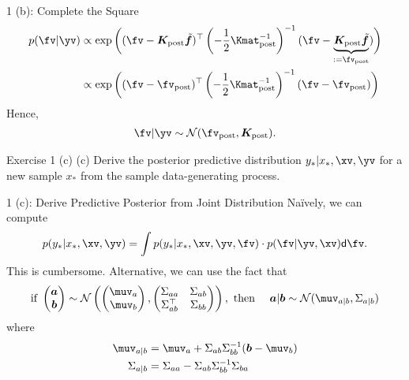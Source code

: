 \documentclass[aspectratio=169]{beamer}
\renewcommand{\N}{\mathcal{N}}
\newcommand{\kpinv}{\Kmat_{\text{post}}^{-1}}
\newcommand{\tfv}{\tilde{\bm{f}}}
\newcommand{\bv}{\bm{b}}
\newcommand{\Kpost}{\bm{K}_{\text{post}}}
\newcommand{\fpost}{\fv_{\text{post}}}
\newcommand{\ys}{y_{*}}
\newcommand{\xs}{x_{*}}
\newcommand{\av}{\bm{a}}
\begin{document}
\begin{frame}{1 (b): Complete the Square}
	\begin{align*}
		p(\fv | \yv) &\propto \exp \bigg( (\fv - \Kpost \tfv )^\top \left( -\frac{1}{2} \kpinv \right)^{-1} (\fv - \underbrace{\Kpost \tfv}_{:= \fpost})\bigg) \\ &\propto \exp \bigg( (\fv - \fpost)^\top \left( -\frac{1}{2} \kpinv \right)^{-1} (\fv - \fpost)\bigg)
	\end{align*}
	Hence,
	\begin{align*}
		\fv | \yv \sim \N(\fpost, \Kpost).
	\end{align*}
\end{frame}

\begin{frame}{Exercise 1 (c)}
	(c) Derive the posterior predictive distribution $\ys | \xs, \xv, \yv$ for a new sample $\xs$ from the sample data-generating process.
\end{frame}

\begin{frame}{1 (c): Derive Predictive Posterior from Joint Distribution}
	Na\"ively, we can compute 
	\begin{align*}
		p(\ys | \xs, \xv, \yv) =\int p(\ys | \xs, \xv, \yv, \fv) \cdot p(\fv | \yv, \xv) \mathsf{d} \fv.
	\end{align*}
	This is cumbersome. Alternative, we can use the fact that 
	\begin{align*}
		\text{if } \begin{pmatrix}
			\av \\
			\bv \\
		\end{pmatrix} 
		\sim \N 
		\left( 
			\begin{pmatrix}
				\muv_{a} \\
				\muv_{b} \\
			\end{pmatrix}, 
			\begin{pmatrix}
				\Sigma_{aa} & \Sigma_{ab} \\
				\Sigma_{ab}^\top & \Sigma_{bb} \\
			\end{pmatrix}
		\right), 
		\ \text{then } \quad  \av | \bv \sim \N(\muv_{a|b}, \Sigma_{a|b})
	\end{align*}
	where 
	\begin{align*}
		\muv_{a|b} &= \muv_a + \Sigma_{ab} \Sigma_{bb}^{-1}(\bv - \muv_b) \\
		\Sigma_{a|b} &= \Sigma_{aa} - \Sigma_{ab} \Sigma_{bb}^{-1} \Sigma_{ba}
	\end{align*}
\end{frame}
\end{document}
